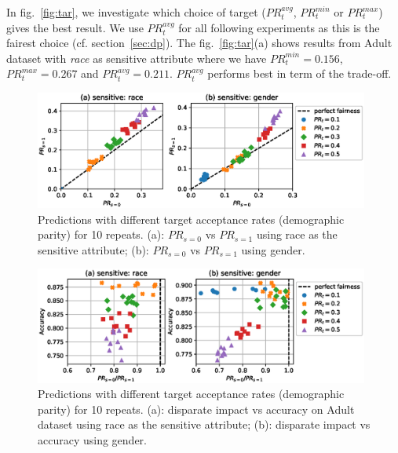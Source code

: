 In fig.~\ref{fig:tar}, we investigate which choice of target ($\mathit{PR}_t^{avg}$, $\mathit{PR}_t^{min}$ or $\mathit{PR}_t^{max}$)
gives the best result.
We use $\mathit{PR}_t^{avg}$ for all following experiments as this is the fairest choice (cf. section~\ref{sec:dp}).
The fig.~\ref{fig:tar}(a) shows results from Adult dataset with \emph{race} as sensitive attribute
where we have $\mathit{PR}_t^{min}=0.156$, $\mathit{PR}_t^{max}=0.267$ and $\mathit{PR}_t^{avg} =0.211$.
$\mathit{PR}_t^{avg}$ performs best in term of the trade-off.%
\begin{figure}[t]
  \centering
  \includegraphics[width=0.98\textwidth]{paper1/figures/adult_parity_scatter_pr_pr.eps}
  \caption{
    Predictions with different target acceptance rates (demographic parity) for 10 repeats.
    (a): $\mathit{PR}_{s=0}$ vs $\mathit{PR}_{s=1}$ using race as the sensitive attribute;
    (b): $\mathit{PR}_{s=0}$ vs $\mathit{PR}_{s=1}$ using gender.
  }%
  \label{fig:adult_parity_scatter_pr_pr}
\end{figure}%
\begin{figure}[t]
  \centering
  \includegraphics[width=0.98\textwidth]{paper1/figures/adult_parity_scatter_acc.eps}
  \caption{
    Predictions with different target acceptance rates (demographic parity) for 10 repeats.
    (a): disparate impact vs accuracy on Adult dataset using race as the sensitive attribute;
    (b): disparate impact vs accuracy using gender.
  }%
  \label{fig:adult_parity_scatter_acc}
\end{figure}%

